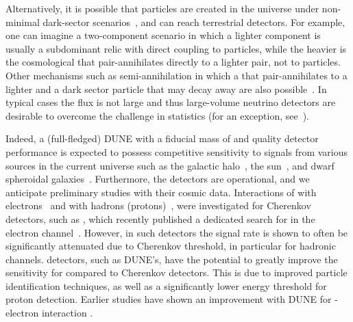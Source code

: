 Alternatively, it is possible that  particles are created in the universe under non-minimal dark-sector scenarios~\cite{Agashe:2014yua,
Belanger:2011ww}, and can reach terrestrial detectors. 
For example, one can imagine a two-component  scenario in which a lighter component is usually a subdominant relic with direct coupling to  particles, while the heavier is the cosmological  that pair-annihilates directly to a lighter  pair, not to  particles. Other mechanisms such as semi-annihilation in which a  that pair-annihilates to a lighter  and a dark sector particle that may decay away are also possible~\cite{Carlson:1992fn, Hochberg:2014dra,Huang:2013xfa,Berger:2014sqa,Kong:2014mia}.
In typical cases the  flux is not large and thus large-volume neutrino detectors are desirable %
to overcome the challenge in statistics (for an  exception, see~\cite{Cherry:2015oca, Cui:2017ytb}).

Indeed, a (full-fledged) DUNE  with a fiducial mass of \fdfiducialmass and quality detector performance is expected to possess competitive sensitivity to  signals from various sources in the current universe such as the galactic halo~\cite{Agashe:2014yua,
Alhazmi:2016qcs,Kim:2016zjx,Giudice:2017zke,Chatterjee:2018mej,Kim:2018veo}, the sun~\cite{Huang:2013xfa,Berger:2014sqa,Kong:2014mia,Kim:2018veo}, and dwarf spheroidal galaxies~\cite{Necib:2016aez}.
Furthermore, the  detectors %
are operational, and we anticipate preliminary studies with their cosmic data. Interactions of  with electrons~\cite{Agashe:2014yua} 
and with hadrons (protons)~\cite{Berger:2014sqa}, were investigated for Cherenkov detectors, such as \superk, which recently published a dedicated search for  in the electron channel~\cite{Kachulis:2017nci}. However, in such detectors the  signal rate is shown to often be significantly attenuated due to Cherenkov threshold, in particular for hadronic channels.  \lar detectors, such as DUNE's, have the potential to greatly improve the sensitivity for  compared to Cherenkov detectors. This is due to improved particle identification techniques, as well as a significantly lower energy threshold for proton detection. Earlier studies have shown an improvement with DUNE for -electron interaction \cite{Necib:2016aez}.

